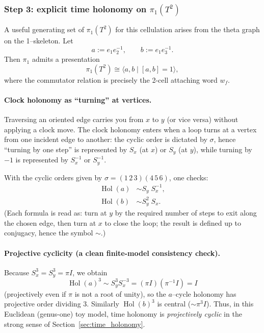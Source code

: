 \documentclass[11pt,oneside]{amsbook}
\numberwithin{equation}{section}
\theoremstyle{plain}
\theoremstyle{definition}
\theoremstyle{remark}
\DeclareMathOperator{\Hol}{\mathrm{Hol}}
\begin{document}
\subsubsection{Step 3: explicit time holonomy on $\pi_1(T^2)$}

A useful generating set of $\pi_1(T^2)$ for this cellulation arises from the theta graph on the 1--skeleton.
Let
\[
a := e_1 e_2^{-1},\qquad b:=e_1 e_3^{-1}.
\]
Then $\pi_1$ admits a presentation
\[
\pi_1(T^2)\cong \langle a,b\mid [a,b]=1\rangle,
\]
where the commutator relation is precisely the 2-cell attaching word $w_f$.

\paragraph{Clock holonomy as ``turning'' at vertices.}
Traversing an oriented edge carries you from $x$ to $y$ (or vice versa) without applying a clock move.
The clock holonomy enters when a loop turns at a vertex from one incident edge to another: the cyclic order is dictated by $\sigma$, hence ``turning by one step'' is represented by $S_x$ (at $x$) or $S_y$ (at $y$), while turning by $-1$ is represented by $S_x^{-1}$ or $S_y^{-1}$.

With the cyclic orders given by $\sigma=(1\,2\,3)(4\,5\,6)$, one checks:
\begin{align}
\Hol(a) &\sim S_y\;S_x^{-1},\label{eq:torus_holonomy_a}\\
\Hol(b) &\sim S_y^{2}\;S_x.\label{eq:torus_holonomy_b}
\end{align}
(Each formula is read as: turn at $y$ by the required number of steps to exit along the chosen edge, then turn at $x$ to close the loop; the result is defined up to conjugacy, hence the symbol $\sim$.)

\paragraph{Projective cyclicity (a clean finite-model consistency check).}
Because $S_x^3=S_y^3=\pi I$, we obtain
\[
\Hol(a)^3 \sim S_y^3 S_x^{-3} = (\pi I)(\pi^{-1}I)=I
\]
(projectively even if $\pi$ is not a root of unity),
so the $a$--cycle holonomy has projective order dividing $3$.
Similarly $\Hol(b)^3$ is central ($\sim \pi^3 I$).
Thus, in this Euclidean (genus-one) toy model, time holonomy is \emph{projectively cyclic} in the strong sense of Section~\ref{sec:time_holonomy}.
\end{document}
